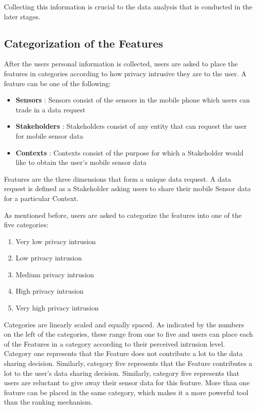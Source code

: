 Collecting this information is crucial to the data analysis that is conducted in the later stages.
\subsection{Categorization of the Features} \label{catfeatures}
After the users personal information is collected, users are asked to place the features in categories according to how privacy intrusive they are to the user. A feature can be one of the following:

\begin{itemize}
\item \textbf{Sensors} : Sensors consist of the sensors in the mobile phone which users
can trade in a data request
\item \textbf{Stakeholders} : Stakeholders
consist of any entity that can request the user for mobile sensor data
\item \textbf{Contexts} : Contexts consist of the purpose for which a Stakeholder would like to obtain the user's mobile sensor data
\end{itemize}

Features are the three dimensions that form a unique data request. A data request is defined as a Stakeholder asking users to share their mobile Sensor data for a particular Context.

As mentioned before, users are asked to categorize the features into one of the five categories:

\begin{enumerate}
\item Very low privacy intrusion
\item Low privacy intrusion
\item Medium privacy intrusion
\item High privacy intrusion
\item Very high privacy intrusion
\end{enumerate}

Categories are linearly scaled and equally spaced. As indicated by the numbers on the left of the categories, these range from one to five and users can place each of the Features in a category according to their perceived intrusion level. Category one represents that the Feature does not contribute a lot to the data sharing decision. Similarly, category five represents that the Feature  contributes a lot to the user's data sharing decision. Similarly, category five represents that users are reluctant to give away their sensor data for this feature. More than one feature can be placed in the same category, which makes it a more powerful tool than the ranking mechanism.

